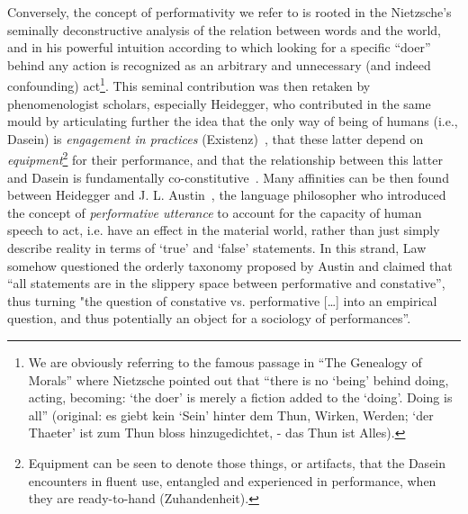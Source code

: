 \documentclass{article}
\begin{document}
Conversely, the concept of performativity we refer to is rooted in the Nietzsche's seminally deconstructive analysis of the relation between words and the world, and in his powerful intuition according to which looking for a specific ``doer'' behind any action is recognized as an arbitrary and unnecessary (and indeed confounding) act\footnote{We are obviously referring to the famous passage in ``The Genealogy of Morals'' where Nietzsche pointed out that  ``there is no `being' behind doing, acting, becoming: `the doer' is merely a fiction added to the `doing'. Doing is all'' (original: es giebt kein `Sein' hinter dem Thun, Wirken, Werden; `der Thaeter' ist zum Thun bloss hinzugedichtet, - das Thun ist Alles).}. This seminal contribution was then retaken by phenomenologist scholars, especially Heidegger, who contributed in the same mould by articulating further the idea that the only way of being of humans (i.e., Dasein) is \textit{engagement in practices} (Existenz)~\citep{riemer_what_2012}, that these latter depend on \emph{equipment}\footnote{Equipment can be seen to denote those things, or artifacts, that the Dasein encounters in fluent use, entangled and experienced in performance, when they are ready-to-hand (Zuhandenheit).} for their performance, and that the relationship between this latter and Dasein is fundamentally co-constitutive~\citep{turner_affordance_2005}. Many affinities can be then found between Heidegger and J. L. Austin~\citep[see e.g., those discussed in ][]{glendinning_being_1998}, the language philosopher who introduced the concept of \emph{performative utterance} to account for the capacity of human speech to act, i.e. have an effect in the material world, rather than just simply describe reality in terms of `true' and `false' statements. In this strand, Law somehow questioned the orderly taxonomy proposed by Austin and claimed that ``all statements are in the slippery space between performative and constative'', thus turning "the question of constative vs. performative [\ldots] into an empirical question, and thus potentially an object for a sociology of performances''\citep{jensen_performing_2002}.
\end{document}
